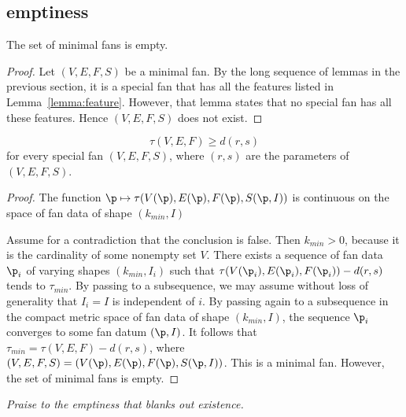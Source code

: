 \subsection{emptiness}


\begin{lemma}[]\label{lemma:min-empty}  
The set of minimal fans is empty.
\end{lemma}

\begin{proof}  Let $(V,E,F,S)$ be a minimal fan.  By the long sequence of lemmas in the
previous section, it is a special fan that has all the features listed in Lemma~\ref{lemma:feature}.
However, that lemma states that no special fan has all these features.  Hence $(V,E,F,S)$
does not exist.
\end{proof}

\begin{lemma}\label{lemma:empty-d}
\begin{displaymath}
\tau(V,E,F) \ge d (r,s)
\end{displaymath}
for every special fan $(V,E,F,S)$, where $(r,s)$ are the parameters of
$(V,E,F,S)$.
\end{lemma}

\begin{proof} 
The function $\p\mapsto \tau(V(\p),E(\p),F(\p),S(\p,I))$ is
continuous on the space of fan data of shape $(k_{min},I)$

Assume for a contradiction that the conclusion is false.  Then
$k_{min}>0$, because it is the cardinality of some nonempty set $V$.
There exists a sequence of fan data $\p_i$ of varying shapes
$(k_{min},I_i)$ such that $\tau(V(\p_i),E(\p_i),F(\p_i))-d(r,s)$
tends to $\tau_{min}$.  By passing to a subsequence, we may assume
without loss of generality that $I_i = I$ is independent of $i$.  By
passing again to a subsequence in the compact metric space of fan
data of shape $(k_{min},I)$, the sequence $\p_i$ converges to some fan datum $(\p,I)$.  It follows that $\tau_{min} =
\tau(V,E,F)-d(r,s)$, where $(V,E,F,S)=(V(\p),E(\p),F(\p),S(\p,I))$.
This is a minimal fan.  However, the set of minimal fans is empty.
\end{proof}

 {\it Praise to
the emptiness that blanks out
existence.} %
%
